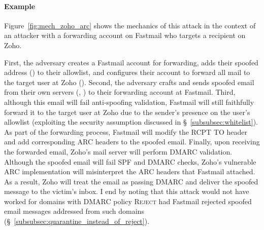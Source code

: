 \paragraph{Example}
Figure~\ref{fig:mech_zoho_arc} shows the mechanics of this attack
in the context of an attacker with a forwarding account on Fastmail who targets a recipient on Zoho.

First,
the adversary creates a Fastmail account for forwarding, adds their spoofed address
() to their allowlist, and configures their
account to forward all mail to the target user at Zoho
().
Second, the adversary crafts and sends
spoofed email from their own servers (\eg, )
to their forwarding account at Fastmail.
Third, although this email will fail anti-spoofing validation, Fastmail will still faithfully forward it to the target user at Zoho due to the sender's presence on the user's allowlist (exploiting the security assumption discussed in \S~\ref{subsubsec:whitelist}). 
As part of the forwarding process,
Fastmail will modify the RCPT TO header and add corresponding ARC headers to the
spoofed email.
Finally, upon receiving the forwarded email, Zoho's mail server will perform DMARC validation.
Although the spoofed email will fail SPF and DMARC checks,
Zoho's vulnerable ARC implementation
will misinterpret the ARC headers that Fastmail attached.
As a result, Zoho will treat the email as passing
DMARC and deliver the spoofed message to the victim's inbox. I end by noting that this attack would not have worked for domains with DMARC policy \textsc{Reject} had Fastmail rejected spoofed email messages addressed from such domains (\S~\ref{subsubsec:quarantine_instead_of_reject}).


